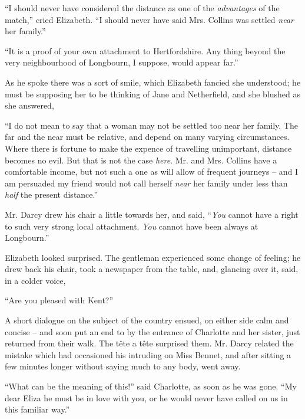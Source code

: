 “I should never have considered the distance as one
of the \textit{advantages} of the match,” cried Elizabeth. “I
should never have said Mrs. Collins was settled \textit{near} her
family.”

“It is a proof of your own attachment to Hertfordshire.
Any thing beyond the very neighbourhood of
Longbourn, I suppose, would appear far.”

As he spoke there was a sort of smile, which Elizabeth
fancied she understood; he must be supposing her to be
thinking of Jane and Netherfield, and she blushed as she
answered,

“I do not mean to say that a woman may not be
settled too near her family. The far and the near must
be relative, and depend on many varying circumstances.
Where there is fortune to make the expence of travelling
unimportant, distance becomes no evil. But that is not
the case \textit{here}. Mr. and Mrs. Collins have a comfortable
income, but not such a one as will allow of frequent
journeys -- and I am persuaded my friend would not call
herself \textit{near} her family under less than \textit{half} the present
distance.”

Mr. Darcy drew his chair a little towards her, and
said, “\textit{You} cannot have a right to such very strong
local attachment. \textit{You} cannot have been always at
Longbourn.”

Elizabeth looked surprised. The gentleman experienced
some change of feeling; he drew back his chair, took
a newspaper from the table, and, glancing over it, said,
in a colder voice,

“Are you pleased with Kent?”

A short dialogue on the subject of the country ensued,
on either side calm and concise -- and soon put an end to
by the entrance of Charlotte and her sister, just returned
from their walk. The tête a tête surprised them. Mr.
Darcy related the mistake which had occasioned his intruding
on Miss Bennet, and after sitting a few minutes
longer without saying much to any body, went away.

“What can be the meaning of this!” said Charlotte,
as soon as he was gone. “My dear Eliza he must be
in love with you, or he would never have called on us in
this familiar way.”

